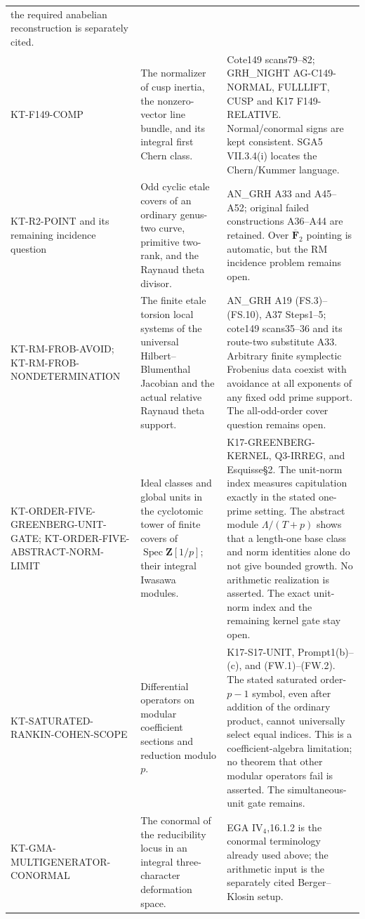 \begin{longtable}{>{\raggedright\arraybackslash}p{}
>{\raggedright\arraybackslash}p{}
>{\raggedright\arraybackslash}p{}}
the required anabelian reconstruction is separately cited.\\
KT-F149-COMP &
The normalizer of cusp inertia, the nonzero-vector line bundle,
and its integral first Chern class. &
Cote149 scans79--82; GRH\_NIGHT AG-C149-NORMAL, FULLLIFT,
CUSP and K17 F149-RELATIVE. Normal/conormal signs are kept
consistent. SGA5 VII.3.4(i) locates the Chern/Kummer language.\\
KT-R2-POINT and its remaining incidence question &
Odd cyclic etale covers of an ordinary genus-two curve,
primitive two-rank, and the Raynaud theta divisor. &
AN\_GRH A33 and A45--A52; original failed constructions
A36--A44 are retained. Over $\overline{\mathbf F}_2$ pointing
is automatic, but the RM incidence problem remains open.\\
KT-RM-FROB-AVOID; KT-RM-FROB-NONDETERMINATION &
The finite etale torsion local systems of the universal
Hilbert--Blumenthal Jacobian and the actual relative
Raynaud theta support. &
AN\_GRH A19 (FS.3)--(FS.10), A37 Steps1--5;
cote149 scans35--36 and its route-two substitute A33.
Arbitrary finite symplectic Frobenius data coexist with
avoidance at all exponents of any fixed odd prime support.
The all-odd-order cover question remains open.\\
KT-ORDER-FIVE-GREENBERG-UNIT-GATE;
KT-ORDER-FIVE-ABSTRACT-NORM-LIMIT &
Ideal classes and global units in the cyclotomic tower of
finite covers of $\operatorname{Spec}\mathbf Z[1/p]$;
their integral Iwasawa modules. &
K17-GREENBERG-KERNEL, Q3-IRREG, and Esquisse\S2.
The unit-norm index measures capitulation exactly in the stated
one-prime setting. The abstract module $\Lambda/(T+p)$
shows that a length-one base class and norm identities alone
do not give bounded growth. No arithmetic realization is asserted.
The exact unit-norm index and the remaining kernel gate stay open.\\
KT-SATURATED-RANKIN-COHEN-SCOPE &
Differential operators on modular coefficient sections and
reduction modulo $p$. &
K17-S17-UNIT, Prompt1(b)--(c), and (FW.1)--(FW.2).
The stated saturated order-$p-1$ symbol, even after addition
of the ordinary product, cannot universally select equal indices.
This is a coefficient-algebra limitation; no theorem that other
modular operators fail is asserted. The simultaneous-unit gate remains.\\
KT-GMA-MULTIGENERATOR-CONORMAL &
The conormal of the reducibility locus in an integral
three-character deformation space. &
EGA IV$_4$,16.1.2 is the conormal terminology already used above;
the arithmetic input is the separately cited Berger--Klosin setup.

\end{longtable}
